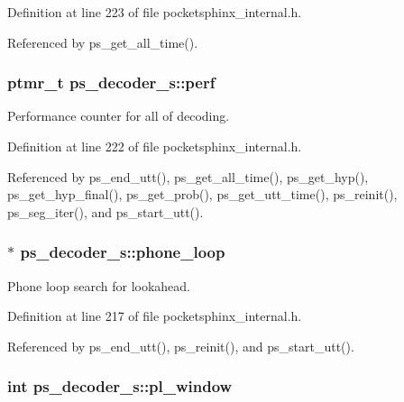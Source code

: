 Definition at line 223 of file pocketsphinx\-\_\-internal.\-h.



Referenced by ps\-\_\-get\-\_\-all\-\_\-time().

\subsubsection[{perf}]{\setlength{\rightskip}{0pt plus 5cm}ptmr\-\_\-t ps\-\_\-decoder\-\_\-s\-::perf}\label{structps__decoder__s_ab42d1d1e300d2a6df5dd3cd796a27d43}


Performance counter for all of decoding. 



Definition at line 222 of file pocketsphinx\-\_\-internal.\-h.



Referenced by ps\-\_\-end\-\_\-utt(), ps\-\_\-get\-\_\-all\-\_\-time(), ps\-\_\-get\-\_\-hyp(), ps\-\_\-get\-\_\-hyp\-\_\-final(), ps\-\_\-get\-\_\-prob(), ps\-\_\-get\-\_\-utt\-\_\-time(), ps\-\_\-reinit(), ps\-\_\-seg\-\_\-iter(), and ps\-\_\-start\-\_\-utt().

\subsubsection[{phone\-\_\-loop}]{$\ast$ ps\-\_\-decoder\-\_\-s\-::phone\-\_\-loop}\label{structps__decoder__s_a0c6d141d7a71a1287be00a1ebcc7643d}


Phone loop search for lookahead. 



Definition at line 217 of file pocketsphinx\-\_\-internal.\-h.



Referenced by ps\-\_\-end\-\_\-utt(), ps\-\_\-reinit(), and ps\-\_\-start\-\_\-utt().

\subsubsection[{pl\-\_\-window}]{\setlength{\rightskip}{0pt plus 5cm}int ps\-\_\-decoder\-\_\-s\-::pl\-\_\-window}\label{structps__decoder__s_a0f0a6681ffd98af789f6bed556c814e4}


